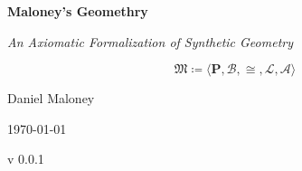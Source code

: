 \documentclass[../main.tex]{subfiles}
\begin{document}
\begin{titlepage}
    \centering

    {\Huge\bfseries Maloney's Geomethry \par}
    \vspace{1cm}

    {\Large\itshape An Axiomatic Formalization of Synthetic Geometry \par}
    \vspace{2cm}

    {\huge
    \[
    \mathfrak{M} \coloneqq \langle \mathbf{P}, \mathcal{B}, \cong, \mathcal{L}, \mathcal{A} \rangle
    \]
    }

    \vfill

    {\Large Daniel Maloney \par}
    \vspace{.5cm}

    {\large \today \par}

    v 0.0.1
\end{titlepage}
\end{document}
